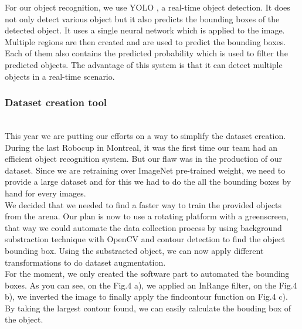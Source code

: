 \documentclass[runningheads,a4paper]{llncs}
\begin{document}
For our object recognition, we use YOLO \cite{yolo}, a real-time object detection. It does not only detect various object but it also predicts the bounding boxes of the detected object. It uses a single neural network which is applied to the image. Multiple regions are then created and are used to predict the bounding boxes. Each of them also contains the predicted probability which is used to filter the predicted objects. The advantage of this system is that it can detect multiple objects in a real-time scenario.\\

\subsubsection{Dataset creation tool}
\hfill\\

This year we are putting our efforts on a way to simplify the dataset creation. During the last Robocup in Montreal, it was the first time our team had an efficient object recognition system. But our flaw was in the production of our dataset. Since we are retraining over ImageNet pre-trained weight, we need to provide a large dataset and for this we had to do the all the bounding boxes by hand for every images.\\
 
We decided that we needed to find a faster way to train the provided objects from the arena. Our plan is now to use a rotating platform with a greenscreen, that way we could automate the data collection process by using background substraction technique with OpenCV and contour detection to find the object bounding box. Using the substracted object, we can now apply different transformations to do dataset augmentation. \\

For the moment, we only created the software part to automated the bounding boxes. As you can see, on the Fig.4 a), we applied an InRange filter, on the Fig.4 b), we inverted the image to finally apply the findcontour function on Fig.4 c). By taking the largest contour found, we can easily calculate the bouding box of the object. \\
 
\end{document}
